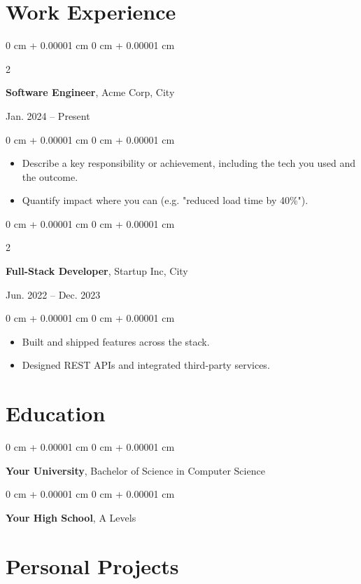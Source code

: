 \documentclass[10pt, letterpaper]{article}
\newenvironment{highlights}{
    \begin{itemize}[
        topsep=0.10 cm,
        parsep=0.10 cm,
        partopsep=0pt,
        itemsep=0pt,
        leftmargin=0 cm + 10pt
    ]
}{
    \end{itemize}
} %
\newenvironment{onecolentry}{
    \begin{adjustwidth}{
        0 cm + 0.00001 cm
    }{
        0 cm + 0.00001 cm
    }
}{
    \end{adjustwidth}
} %
\newenvironment{twocolentry}[2][]{
    \onecolentry
    \def\secondColumn{#2}
    \setcolumnwidth{\fill, 4.5 cm}
    \begin{paracol}{2}
}{
    \switchcolumn \raggedleft \secondColumn
    \end{paracol}
    \endonecolentry
} %
\begin{document}
\section{Work Experience}


\begin{twocolentry}{
    Jan. 2024 – Present
}
    \textbf{Software Engineer}, Acme Corp, City
\end{twocolentry}
\begin{onecolentry}
    \begin{highlights}
        \item Describe a key responsibility or achievement, including the tech you used and the outcome.
        \item Quantify impact where you can (e.g. "reduced load time by 40\%").
    \end{highlights}
\end{onecolentry}

\vspace{0.2 cm}

\begin{twocolentry}{
    Jun. 2022 – Dec. 2023
}
    \textbf{Full-Stack Developer}, Startup Inc, City
\end{twocolentry}
\begin{onecolentry}
    \begin{highlights}
        \item Built and shipped features across the stack.
        \item Designed REST APIs and integrated third-party services.
    \end{highlights}
\end{onecolentry}


\section{Education}

\begin{onecolentry}
    \textbf{Your University}, Bachelor of Science in Computer Science
\end{onecolentry}

\vspace{0.1 cm}

\begin{onecolentry}
    \textbf{Your High School}, A Levels
\end{onecolentry}


\section{Personal Projects}
\end{document}
